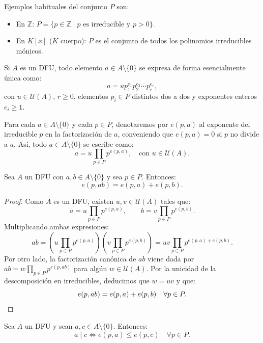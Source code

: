 \begin{ejemplo}
    Ejemplos habituales del conjunto $P$ son:
    \begin{itemize}
        \item En $\mathbb{Z}$: $P = \{p \in \mathbb{Z} \mid p \text{ es irreducible y } p > 0\}$.
        \item En $K[x]$ ($K$ cuerpo): $P$ es el conjunto de todos los polinomios irreducibles mónicos.
    \end{itemize}
\end{ejemplo}

Si $A$ es un DFU, todo elemento $a \in A \setminus \{0\}$ se expresa de forma esencialmente única como:
\[
    a = u p_1^{e_1} p_2^{e_2} \cdots p_r^{e_r},
\]
con $u \in \mathcal{U}(A)$, $r \geq 0$, elementos $p_i \in P$ distintos dos a dos y exponentes enteros $e_i \geq 1$.

\begin{notacion}
    Para cada $a \in A \setminus \{0\}$ y cada $p \in P$, denotaremos por $e(p,a)$ al exponente del irreducible $p$ en la factorización de $a$, conveniendo que $e(p,a) = 0$ si $p$ no divide a $a$. Así, todo $a \in A \setminus \{0\}$ se escribe como:
    \[
        a = u \prod\limits_{p \in P} p^{e(p,a)}, \quad \text{con } u \in \mathcal{U}(A).
    \]
\end{notacion}

\begin{lema}
    Sea $A$ un DFU con $a, b \in A \setminus \{0\}$ y sea $p \in P$. Entonces:
    \[
        e(p,ab) = e(p,a) + e(p,b).
    \]
\end{lema}

\begin{proof}
    Como $A$ es un DFU, existen $u, v \in \mathcal{U}(A)$ tales que:
    \[
        a = u \prod\limits_{p \in P} p^{e(p,a)}, \qquad b = v \prod\limits_{p \in P} p^{e(p,b)}.
    \]
    Multiplicando ambas expresiones:
    \[
        ab = \left(u \prod\limits_{p \in P} p^{e(p,a)}\right) \left(v \prod\limits_{p \in P} p^{e(p,b)}\right) = uv \prod\limits_{p \in P} p^{e(p,a) + e(p,b)}.
    \]
    Por otro lado, la factorización canónica de $ab$ viene dada por $ab = w \prod\limits_{p \in P} p^{e(p,ab)}$ para algún $w \in \mathcal{U}(A)$. Por la unicidad de la descomposición en irreducibles, deducimos que $w = uv$ y que:
    \[
        e(p,ab) = e(p,a) + e(p,b) \quad \forall p \in P. \qedhere
    \]
\end{proof}

\begin{lema}
    Sea $A$ un DFU y sean $a, c \in A \setminus \{0\}$. Entonces:
    \[
        a \mid c \iff e(p,a) \leq e(p,c) \quad \forall p \in P.
    \]
\end{lema}

